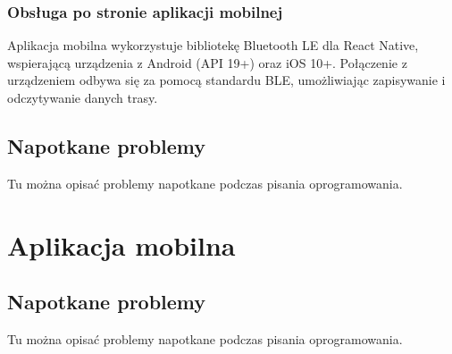 \subsubsection{Obsługa po stronie aplikacji mobilnej}
Aplikacja mobilna wykorzystuje bibliotekę Bluetooth LE dla React Native, wspierającą urządzenia z Android (API 19+) oraz iOS 10+. Połączenie z urządzeniem odbywa się za pomocą standardu BLE, umożliwiając zapisywanie i odczytywanie danych trasy.
\subsection{Napotkane problemy}
Tu można opisać problemy napotkane podczas pisania oprogramowania.

\section{Aplikacja mobilna}
\subsection{Napotkane problemy}
Tu można opisać problemy napotkane podczas pisania oprogramowania.